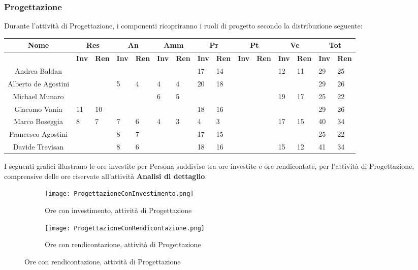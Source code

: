 \documentclass{scalatekids-article}
\begin{document}
\newpage
\subsubsection{Progettazione}
Durante l'attività di Progettazione, i componenti ricopriranno i ruoli di progetto secondo la distribuzione seguente:
\begin{center}
  \scriptsize
  \begin{tabular}{| c | p{0.35cm}  p{0.35cm} | p{0.35cm}  p{0.35cm} | p{0.35cm}  p{0.35cm} | p{0.35cm}  p{0.35cm} | p{0.35cm}  p{0.35cm} | p{0.35cm}  p{0.35cm} | p{0.35cm}  p{0.35cm} |}
    \hline
    \textbf{Nome} & \multicolumn{2}{|c|}{\textbf{Res}} & \multicolumn{2}{|c|}{\textbf{An}} & \multicolumn{2}{|c|}{\textbf{Amm}} & \multicolumn{2}{|c|}{\textbf{Pr}} & \multicolumn{2}{|c|}{\textbf{Pt}} & \multicolumn{2}{|c|}{\textbf{Ve}} & \multicolumn{2}{|c|}{\textbf{Tot}}\\
    \hline
    & \textbf{Inv} & \textbf{Ren} & \textbf{Inv} & \textbf{Ren} & \textbf{Inv} & \textbf{Ren} & \textbf{Inv} & \textbf{Ren} & \textbf{Inv} & \textbf{Ren} & \textbf{Inv} & \textbf{Ren} & \textbf{Inv} & \textbf{Ren}\\
    \hline
    Andrea Baldan & & & & & & & 17 & 14 & & & 12 & 11 & 29 & 25\\
    Alberto de Agostini & & & 5 & 4 & 4 & 4 & 20 & 18 & & & & & 29 & 26\\
    Michael Munaro & & & & & 6 & 5 & & & & & 19 & 17 & 25 & 22\\
    Giacomo Vanin & 11 & 10 & & & & & 18 & 16 & & & & & 29 & 26\\
    Marco Boseggia & 8 & 7 & 7 & 6 & 4 & 3 & 4 & 3 & & & 17 & 15 & 40 & 34\\
    Francesco Agostini & & & 8 & 7 & & & 17 & 15 & & & & & 25 & 22\\
    Davide Trevisan & & & 8 & 6 & & & 18 & 16 & & & 15 & 12 & 41 & 34\\
    \hline
  \end{tabular}
\end{center}
I seguenti grafici illustrano le ore investite per Persona suddivise tra ore
investite e ore rendicontate, per l'attività di Progettazione, comprensive delle
ore riservate all'attività \textbf{Analisi di dettaglio}.
\begin{figure}[H]
  \begin{subfigure}[H]{0.47\textwidth}
    \texttt{[image: ProgettazioneConInvestimento.png]}
    \caption{Ore con investimento, attività di Progettazione}
  \end{subfigure}
  \qquad
  \begin{subfigure}[H]{0.47\textwidth}
    \texttt{[image: ProgettazioneConRendicontazione.png]}
    \caption{Ore con rendicontazione, attività di Progettazione}
  \end{subfigure}
\end{figure}
\newpage
\end{document}
